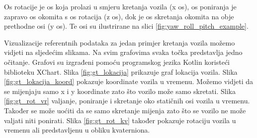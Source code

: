 Os rotacije je os koja prolazi u smjeru kretanja vozila (x os), os poniranja je zapravo os okomita s os rotacija (z os), dok je os skretanja okomita na obje prethodne osi (y os). Te osi su ilustrirane na slici \ref{fig:yaw_roll_pitch_example}.

Vizualizacije referentnih podataka za jedan primjer kretanja vozila možemo vidjeti na sljedećim slikama. Na svim grafovima svaka točka predstavlja jedno očitanje. Grafovi su izgrađeni pomoću programskog jezika Kotlin koristeći biblioteku XChart. Slika \ref{fig:gt_lokacija} prikazuje graf lokacija vozila. Slika \ref{fig:gt_lokacija_koord} pokazuje koordinate vozila u vremenu. Možemo vidjeti da se mijenjaju samo x i y koordinate zato što vozilo može samo skretati. Slika \ref{fig:gt_rot_vr} valjanje, poniranje i skretanje oko statičnih osi vozila u vremenu. Također se može uoćiti da se samo skretanje mijenja zato što se vozilo ne može valjati niti ponirati. Slika \ref{fig:gt_rot_kv} također pokazuje rotaciju vozila u vremenu  ali predstavljenu u obliku kvaterniona. 

